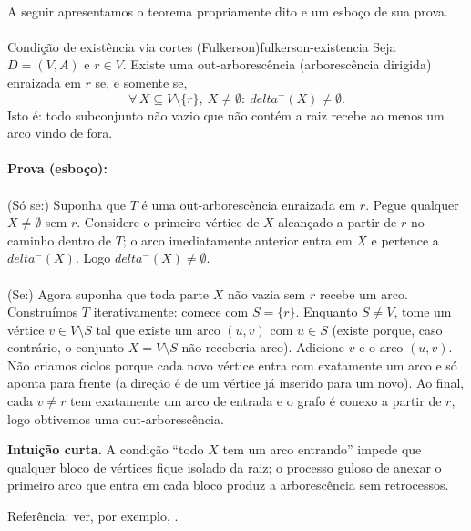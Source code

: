 \documentclass[12pt,a4paper]{article}
\def\emph#1{#1}%
\def\delta{delta}%
\begin{document}
\paragraph{}
A seguir apresentamos o teorema propriamente dito e um esboço de sua prova.

\paragraph{}
\begin{teobox}{Condição de existência via cortes (Fulkerson)}{fulkerson-existencia}
    Seja $D=(V,A)$ e $r\in V$. Existe uma out-arborescência (arborescência dirigida) enraizada em $r$ se, e somente se,
    \[
        \forall\, X\subseteq V\setminus\{r\},\ X\neq\emptyset:\  \delta^-(X)\neq\emptyset.
    \]
    Isto é: todo subconjunto não vazio que não contém a raiz recebe ao menos um arco vindo de fora.

    \paragraph{}
    \textbf{Prova (esboço):}

    \paragraph{}
    \emph{(Só se:)} Suponha que $T$ é uma out-arborescência enraizada em $r$. Pegue qualquer $X\neq\emptyset$ sem $r$. Considere o primeiro vértice de $X$ alcançado a partir de $r$ no caminho dentro de $T$; o arco imediatamente anterior entra em $X$ e pertence a $\delta^-(X)$. Logo $\delta^-(X)\neq\emptyset$.

    \paragraph{}
    \emph{(Se:)} Agora suponha que toda parte $X$ não vazia sem $r$ recebe um arco. Construímos $T$ iterativamente: comece com $S=\{r\}$. Enquanto $S\neq V$, tome um vértice $v\in V\setminus S$ tal que existe um arco $(u,v)$ com $u\in S$ (existe porque, caso contrário, o conjunto $X=V\setminus S$ não receberia arco). Adicione $v$ e o arco $(u,v)$. Não criamos ciclos porque cada novo vértice entra com exatamente um arco e só aponta para frente (a direção é de um vértice já inserido para um novo). Ao final, cada $v\neq r$ tem exatamente um arco de entrada e o grafo é conexo a partir de $r$, logo obtivemos uma out-arborescência.

    \medskip
    \textbf{Intuição curta.} A condição “todo $X$ tem um arco entrando” impede que qualquer bloco de vértices fique isolado da raiz; o processo guloso de anexar o primeiro arco que entra em cada bloco produz a arborescência sem retrocessos.

    \medskip
    \emph{Referência:} ver, por exemplo, \cite{schrijver2003comb}.
    \label{thm:fulkerson-cut-arborescencia}
\end{teobox}
\end{document}
